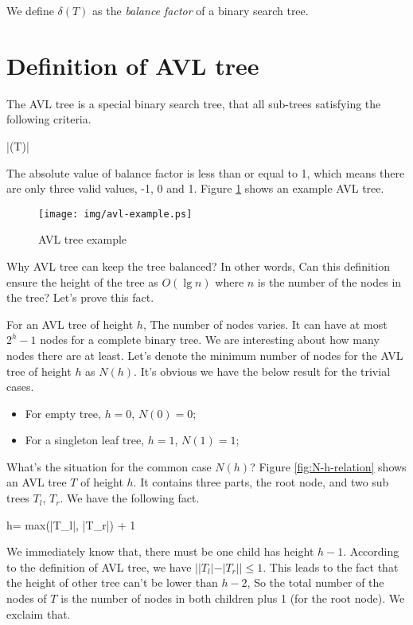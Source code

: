 \documentclass{article}
\begin{document}
We define $\delta(T)$ as the {\em balance factor} of a binary search
tree.

\section{Definition of AVL tree}

The AVL tree is a special binary search tree, that all sub-trees
satisfying the following criteria.

\be
  |\delta(T)| 
\ee

The absolute value of balance factor is less than or equal to 1, which
means there are only three valid values, -1, 0 and 1. Figure \ref{fig:avl-example} shows an example AVL tree.

\begin{figure}[htbp]
   \centering
   \texttt{[image: img/avl-example.ps]}
   \caption{AVL tree example} \label{fig:avl-example}
\end{figure}


Why AVL tree can keep the tree balanced? In other words, Can this definition
ensure the height of the tree as $O(\lg n)$ where $n$ is the number of
the nodes in the tree? Let's prove this fact.

For an AVL tree of height $h$, The number of nodes varies. It can have at
most $2^h-1$ nodes for a complete binary tree. We are interesting about
how many nodes there are at least. Let's denote the minimum number of nodes
for the AVL tree of height $h$ as $N(h)$. It's obvious we have the below
result for the trivial cases.

\begin{itemize}
\item For empty tree, $h=0$, $N(0)=0$;
\item For a singleton leaf tree, $h=1$, $N(1)=1$;
\end{itemize}

What's the situation for the common case $N(h)$? Figure \ref{fig:N-h-relation}
shows an AVL tree $T$ of height $h$. It contains three parts, the root node,
and two sub trees $T_l$, $T_r$. We have the following fact.

\be
  h= max(|T_l|, |T_r|) + 1
\ee

We immediately know that, there must be one child has height $h-1$. According
to the definition of AVL tree, we have
$||T_l|-|T_r|| \leq 1$. This leads to the fact that the height of
other tree can't be lower than $h-2$, So the total number of the nodes
of $T$ is the number of nodes in both children plus 1 (for the root node).
We exclaim that.
\end{document}
